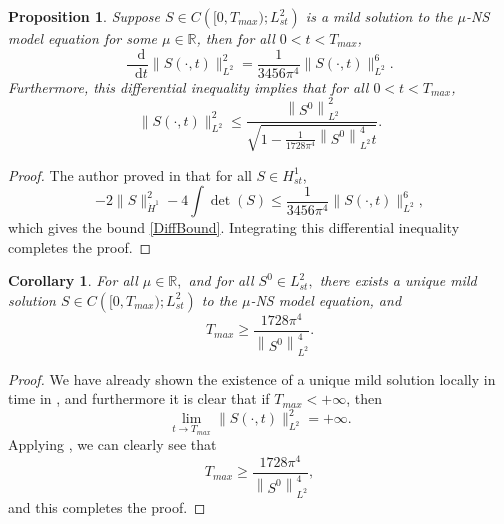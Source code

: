 \documentclass[11pt]{article}
\theoremstyle{plain}
\newtheorem{corollary}[theorem]{Corollary}
\newtheorem{proposition}[theorem]{Proposition}
\theoremstyle{remark}
\numberwithin{equation}{section}
\newcommand{\diff}{\mathop{}\!\mathrm{d}}
\begin{document}
\begin{proposition} \label{EnstrophyBoundProp}
    Suppose $S\in C\left([0,T_{max});L^2_{st}\right)$ is a mild solution to the $\mu$-NS model equation 
    for some $\mu\in\mathbb{R}$,
    then for all $0<t<T_{max}$,
    \begin{equation} \label{DiffBound}
    \frac{\diff}{\diff t}
    \|S(\cdot,t)\|_{L^2}^2=
    \frac{1}{3456\pi^4} \|S(\cdot,t)\|_{L^2}^6.
\end{equation}
Furthermore, this differential inequality implies that
for all $0<t<T_{max}$,
\begin{equation}
    \|S(\cdot,t)\|_{L^2}^2\leq
    \frac{\left\|S^0\right\|_{L^2}^2}
    {\sqrt{1-\frac{1}{1728\pi^4}\left\|S^0\right\|_{L^2}^4 t}}.
\end{equation}
\end{proposition}


\begin{proof}
    The author proved in \cite{MillerAlmost2D} that for all $S\in H^1_{st}$,
    \begin{equation}
    -2\|S\|_{\dot{H}^1}^2
    -4\int\det(S)
    \leq 
    \frac{1}{3456\pi^4} \|S(\cdot,t)\|_{L^2}^6,
    \end{equation}
    which gives the bound \eqref{DiffBound}.
    Integrating this differential inequality completes the proof.
\end{proof}




\begin{corollary} \label{TimeBoundCor}
For all $\mu\in\mathbb{R},$ and for all $S^0\in L^2_{st},$
there exists a unique mild solution
$S\in C\left([0,T_{max});L^2_{st}\right)$ to the $\mu$-NS model equation, and
\begin{equation}
    T_{max}\geq \frac{1728\pi^4}{\left\|S^0\right\|_{L^2}^4}.
\end{equation}
\end{corollary}


\begin{proof}
    We have already shown the existence of a unique mild solution locally in time in , and furthermore it is clear that if $T_{max}<+\infty$,
    then
    \begin{equation}
    \lim_{t \to T_{max}}
    \|S(\cdot,t)\|_{L^2}^2
    =+\infty.
    \end{equation}
    Applying , we can clearly see that
    \begin{equation}
    T_{max}\geq \frac{1728\pi^4}{\left\|S^0\right\|_{L^2}^4},
    \end{equation}
    and this completes the proof.
\end{proof}
\end{document}
